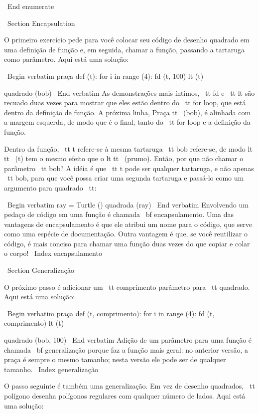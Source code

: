 \documentclass[10pt]{book}
\begin{document}
\begin {itemize}
{\ End {enumerate}

\ Section {} Encapsulation

O primeiro exercício pede para você colocar seu código de desenho quadrado
em uma definição de função e, em seguida, chamar a função, passando
a tartaruga como parâmetro. Aqui está uma solução:

\ Begin {verbatim}
praça def (t):
    for i in range (4):
        fd (t, 100)
        lt (t)

quadrado (bob)
\ End {verbatim}
%
As demonstrações mais íntimos, {\ tt fd} e {\ tt lt} são
recuado duas vezes para mostrar que eles estão dentro do {\ tt for} loop,
que está dentro da definição de função. A próxima linha,
{Praça tt \ (bob)}, é alinhada com a margem esquerda, de modo que é o
final, tanto do {\ tt for} loop e a definição da função.

Dentro da função, {\ tt t} refere-se à mesma tartaruga {\ tt bob}
refere-se, de modo {lt tt \ (t)} tem o mesmo efeito que o {lt tt \ (prumo)}.
Então, por que não chamar o parâmetro {\ tt bob}? A idéia é que {\ tt t}
pode ser qualquer tartaruga, e não apenas {\ tt bob}, para que você possa criar
uma segunda tartaruga e passá-lo como um argumento para {quadrado \ tt}:

\ Begin {verbatim}
ray = Turtle ()
quadrada (ray)
\ End {verbatim}
%
Envolvendo um pedaço de código em uma função é chamada {\ bf
encapsulamento}. Uma das vantagens de encapsulamento é que ele
atribui um nome para o código, que serve como uma espécie de documentação.
Outra vantagem é que, se você reutilizar o código, é mais conciso
para chamar uma função duas vezes do que copiar e colar o corpo!
\ Index {} encapsulamento


\ Section {} Generalização

O próximo passo é adicionar um {\ tt comprimento} parâmetro para {\ tt quadrado}.
Aqui está uma solução:

\ Begin {verbatim}
praça def (t, comprimento):
    for i in range (4):
        fd (t, comprimento)
        lt (t)

quadrado (bob, 100)
\ End {verbatim}
%
Adição de um parâmetro para uma função é chamada {\ bf generalização}
porque faz a função mais geral: no anterior
versão, a praça é sempre o mesmo tamanho; nesta versão
ele pode ser de qualquer tamanho.
\ Index {generalização}

O passo seguinte é também uma generalização. Em vez de desenho
quadrados, {\ tt polígono} desenha polígonos regulares com qualquer número de
lados. Aqui está uma solução:

}
\end{itemize}
\end{document}
